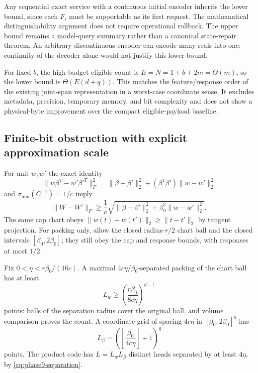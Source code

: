 Any sequential exact service with a continuous initial encoder inherits
the lower bound, since each $F_i$ must be supportable as its first request.
The mathematical distinguishability argument does not require operational
rollback.  The upper bound remains a model-query summary rather than a
canonical state-repair theorem.  An arbitrary discontinuous encoder can
encode many reals into one; continuity of the decoder alone would not
justify this lower bound.

For fixed $b$, the high-budget eligible count is
$E=N=1+b+2m=\Theta(m)$, so the lower bound is
$\Theta(E(d+q))$.  This matches the feature/response order of the existing
joint-span representation in a worst-case coordinate sense.  It excludes
metadata, precision, temporary memory, and bit complexity and does not
show a physical-byte improvement over the compact eligible-payload baseline.

\subsection{Finite-bit obstruction with explicit approximation scale}
For unit $w,w'$ the exact identity
\[
 \|w\beta^T-w'\beta'^T\|_F^2
 =\|\beta-\beta'\|_2^2+(\beta^T\beta')\|w-w'\|_2^2
\]
and $\sigma_{\min}(C^{-1})=1/c$ imply
\begin{equation}\label{eq:phase9-separation}
 \|W-W'\|_F\ge\frac1c
 \sqrt{\|\beta-\beta'\|_2^2+\beta_0^2\|w-w'\|_2^2}.
\end{equation}
The same cap chart obeys
$\|w(t)-w(t')\|_2\ge\|t-t'\|_2$ by tangent projection.
For packing only, allow the closed radius-$r/2$ chart ball and the closed
intervals $[\beta_0,2\beta_0]$; they still obey the cap and response bounds,
with responses at most $1/2$.

Fix $0<\eta<r\beta_0/(16c)$.  A maximal
$4c\eta/\beta_0$-separated packing of the chart ball has at least
\[
 L_w\ge\left(\frac{r\beta_0}{8c\eta}\right)^{d-1}
\]
points: balls of the separation radius cover the original ball, and volume
comparison proves the count.  A coordinate grid of spacing $4c\eta$ in
$[\beta_0,2\beta_0]^q$ has
\[
 L_\beta=\left(\left\lfloor\frac{\beta_0}{4c\eta}\right\rfloor+1\right)^q
\]
points.  The product code has $L=L_wL_\beta$ distinct heads separated by at
least $4\eta$, by \eqref{eq:phase9-separation}.

